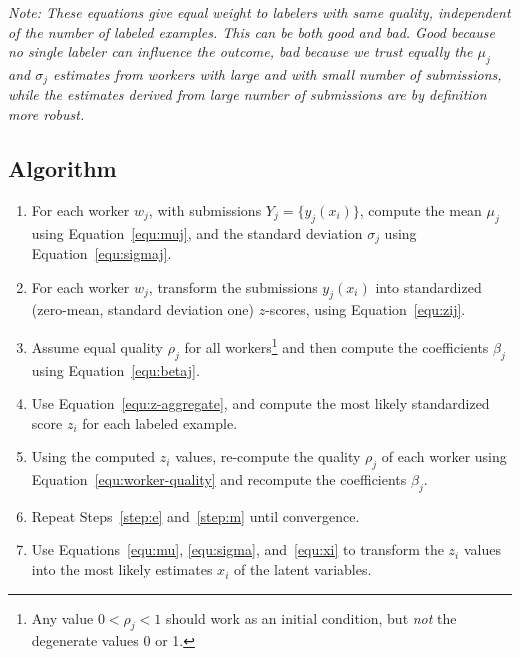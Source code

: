 \documentclass{article}
\begin{document}
\emph{Note: These equations give equal weight to labelers with same quality, independent of the number of labeled examples. This can be both good and bad. Good because no single labeler can influence the outcome, bad because we trust equally the $\mu_j$ and $\sigma_j$ estimates from workers with large and with small number of submissions, while the estimates derived from large number of submissions are by definition more robust.}


\subsection{Algorithm}

\begin{enumerate}

\item For each worker $w_j$, with submissions $Y_j = \{ y_j(x_i) \}$, compute the mean $\mu_j$ using Equation~\ref{equ:muj}, and the standard deviation $\sigma_j$ using Equation~\ref{equ:sigmaj}.

\item For each worker $w_j$, transform the submissions $y_j(x_i)$ into standardized (zero-mean, standard deviation one) $z$-scores, using Equation~\ref{equ:zij}.

\item Assume equal quality $\rho_j$ for all workers\footnote{Any value $0<\rho_j<1$ should work as an initial condition, but \emph{not} the degenerate values 0 or 1.} and then compute the coefficients $\beta_j$ using Equation~\ref{equ:betaj}.

\item \label{step:e} Use Equation~\ref{equ:z-aggregate}, and compute the most likely standardized score $z_i$ for each labeled example.

\item \label{step:m} Using the computed $z_i$ values, re-compute the quality $\rho_j$ of each worker using Equation~\ref{equ:worker-quality} and recompute the coefficients $\beta_j$.

\item Repeat Steps~\ref{step:e} and~\ref{step:m} until convergence.

\item Use Equations~\ref{equ:mu}, \ref{equ:sigma}, and~\ref{equ:xi} to transform the $z_i$ values into the most likely estimates $x_i$ of the latent variables.

\end{enumerate}
\end{document}
